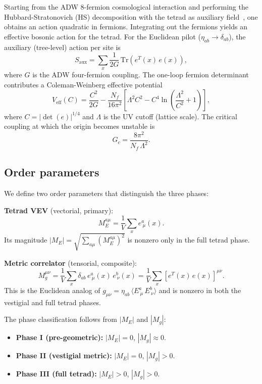 \documentclass[aps,prd,twocolumn,superscriptaddress,nofootinbib]{revtex4-2}
\newcommand{\vev}[1]{\langle #1 \rangle}
\newcommand{\tr}{\mathrm{Tr}}
\newcommand{\Gc}{G_c}
\newcommand{\Nf}{N_f}
\newcommand{\Veff}{V_{\mathrm{eff}}}
\begin{document}
Starting from the ADW 8-fermion cosmological interaction and performing
the Hubbard-Stratonovich (HS) decomposition with the tetrad as auxiliary
field~\cite{VladimirovDiakonov2012}, one obtains an action quadratic in
fermions. Integrating out the fermions yields an effective bosonic action
for the tetrad. For the Euclidean pilot ($\eta_{ab} \to \delta_{ab}$),
the auxiliary (tree-level) action per site is
\begin{equation}
S_{\mathrm{aux}} = \sum_x \frac{1}{2G}\,
  \tr\!\left(e^T(x)\, e(x)\right),
\label{eq:saux}
\end{equation}
where $G$ is the ADW four-fermion coupling. The one-loop fermion
determinant contributes a Coleman-Weinberg effective potential
\begin{equation}
\Veff(C) = \frac{C^2}{2G}
  - \frac{\Nf}{16\pi^2}\!\left[\Lambda^2 C^2
  - C^4\ln\!\left(\frac{\Lambda^2}{C^2}+1\right)\right],
\label{eq:veff}
\end{equation}
where $C = |\det(e)|^{1/4}$ and $\Lambda$ is the UV cutoff (lattice
scale). The critical coupling at which the origin becomes unstable is
\begin{equation}
\Gc = \frac{8\pi^2}{\Nf\,\Lambda^2}.
\label{eq:Gc}
\end{equation}

\subsection{Order parameters}

We define two order parameters that distinguish the three phases:

\textbf{Tetrad VEV} (vectorial, primary):
\begin{equation}
M_E^{a\mu} = \frac{1}{V}\sum_x e^a_{\ \mu}(x).
\label{eq:ME}
\end{equation}
Its magnitude $|M_E| = \sqrt{\sum_{a\mu}(M_E^{a\mu})^2}$ is nonzero
only in the full tetrad phase.

\textbf{Metric correlator} (tensorial, composite):
\begin{equation}
M_g^{\mu\nu} = \frac{1}{V}\sum_x \delta_{ab}\,
  e^a_{\ \mu}(x)\, e^b_{\ \nu}(x)
  = \frac{1}{V}\sum_x \left[e^T(x)\, e(x)\right]^{\mu\nu}.
\label{eq:Mg}
\end{equation}
This is the Euclidean analog of
$g_{\mu\nu} = \eta_{ab}\,\vev{E^a_{\ \mu}\, E^b_{\ \nu}}$ and is
nonzero in both the vestigial and full tetrad phases.

The phase classification follows from $|M_E|$ and $|M_g|$:
\begin{itemize}
\item \textbf{Phase I (pre-geometric):} $|M_E| = 0$, $|M_g| \approx 0$.
\item \textbf{Phase II (vestigial metric):} $|M_E| = 0$, $|M_g| > 0$.
\item \textbf{Phase III (full tetrad):} $|M_E| > 0$, $|M_g| > 0$.
\end{itemize}
\end{document}
